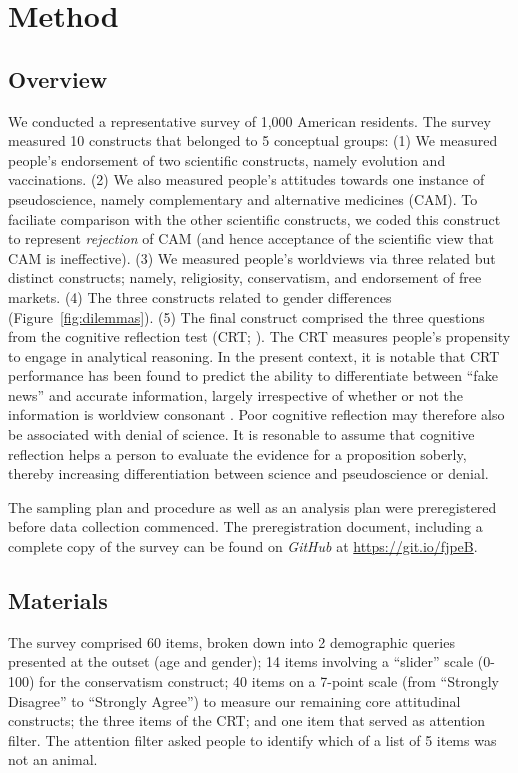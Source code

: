 \documentclass[fignum,man]{apa}\usepackage[]{graphicx}\usepackage[]{color}
\begin{document}
\section{Method}

\subsection{Overview}
We conducted a representative survey of 1,000 American residents.
The survey 
measured 10 constructs that belonged
to 5 conceptual groups:
(1) We measured people's endorsement of
two scientific constructs, namely evolution and vaccinations.
(2) We also measured people's attitudes towards
one instance of pseudoscience, namely
complementary and alternative medicines (CAM). 
To faciliate comparison with the other scientific constructs,
we coded this construct to represent \textit{rejection }of CAM
(and hence acceptance of the scientific view that
CAM is ineffective).
(3) We measured people's worldviews via three
related but distinct constructs; namely,
religiosity, conservatism, and endorsement of free markets.
(4) The three constructs related to gender differences (Figure~\ref{fig:dilemmas}).
(5) The final construct comprised the
three questions from the cognitive reflection test 
(CRT; ).
The CRT measures people's propensity to engage in analytical reasoning.
In the present context, it is notable that CRT performance 
has been found to predict the ability to differentiate between ``fake news''
and accurate information, largely irrespective 
of whether or not the information
is worldview consonant \cite{Pennycook18}. 
Poor cognitive reflection may therefore also be associated with
denial of science. 
It is resonable to assume that cognitive reflection helps a person to 
evaluate the evidence for a proposition soberly, thereby 
increasing differentiation between science and pseudoscience or denial.

The sampling plan and procedure as well as an analysis
plan were preregistered before data collection
commenced. The preregistration document, including a complete
copy of the survey can be found on \textit{GitHub} at 
\url{https://git.io/fjpeB}.


\subsection{Materials}
The survey comprised 60 items, broken
down into 2 demographic queries presented at the outset (age and gender); 
14 items involving a ``slider'' scale (0-100) for the conservatism
construct; 
40 items on a 7-point scale (from ``Strongly Disagree'' to ``Strongly Agree'') 
to measure 
our remaining core attitudinal constructs;
the three items of the CRT;
and one item that served as attention filter. 
The attention filter asked people to identify which of a list of 5 items
was not an animal.
\end{document}
